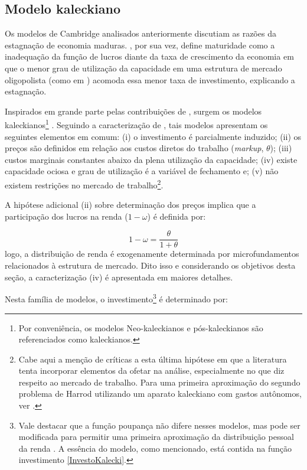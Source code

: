\subsection{Modelo kaleckiano}

Os modelos de Cambridge analisados anteriormente discutiam as razões da estagnação de economia maduras.
\textcite{steindl_stagnation_1979}, por sua vez, define maturidade como a inadequação da função de lucros diante da taxa de crescimento da economia em que o menor grau de utilização da capacidade em uma estrutura de mercado oligopolista (como em \textcite{kalecki_theory_1954}) acomoda essa menor taxa de investimento, explicando a estagnação. 

Inspirados em grande parte pelas contribuições de \textcite{steindl_stagnation_1979}, surgem os modelos kaleckianos\footnote{Por conveniência, os modelos Neo-kaleckianos e pós-kaleckianos são referenciados como kaleckianos.} \cites{rowthorn_demand_1981}{dutt_stagnation_1984}{taylor_stagnationist_1985}{amadeo_role_1986}{bhaduri_unemployment_1990}. Seguindo a caracterização de \textcite[p.~790]{lavoie_kaleckian_1995}, tais modelos apresentam os seguintes elementos em comum: (i) o investimento é parcialmente induzido; (ii) os preços são definidos em relação aos custos diretos do trabalho (\textit{markup}, $\theta$); (iii) custos marginais constantes abaixo da plena utilização da capacidade; (iv) existe capacidade ociosa e grau de utilização é a variável de fechamento e; (v) não existem restrições no mercado de trabalho\footnote{Cabe aqui a menção de críticas a esta última hipótese em que a literatura tenta incorporar elementos da ofetar na análise, especialmente no que diz respeito ao mercado de trabalho. Para uma primeira aproximação do segundo problema de Harrod utilizando um aparato kaleckiano com gastos autônomos, ver \textcite{allain_demographic_2018}.}. 

A hipótese adicional (ii) sobre determinação dos preços implica que a participação dos lucros na renda ($1-\omega$) é definida por:

$$
1- \omega = \frac{\theta}{1+\theta}
$$
logo, a distribuição de renda é exogenamente determinada por microfundamentos relacionados à estrutura de mercado. Dito isso e considerando os objetivos desta seção, a caracterização (iv) é apresentada em maiores detalhes.

Nesta família de modelos, o investimento\footnote{Vale destacar que a função poupança não difere nesses modelos, mas pode ser modificada para permitir uma primeira aproximação  da distribuição pessoal da renda \cites{carvalho_personal_2016}{palley_wage-_2017}. A essência do modelo, como mencionado, está contida na função investimento \ref{InvestoKalecki}.} é determinado por:

